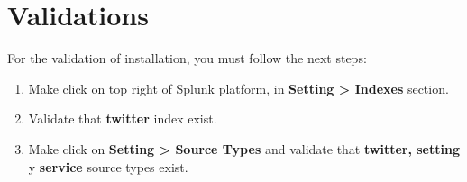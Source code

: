 \documentclass[report]{article}
\begin{document}
\section{Validations}

For the validation of installation, you must follow the next steps:
\newline

\begin{enumerate}[label=(\alph*)]
\item Make click on top right of Splunk platform, in \textbf{Setting > Indexes} section.
\item Validate that \textbf{twitter} index exist.
\item Make click on \textbf{Setting > Source Types} and validate that \textbf{twitter, setting} y \textbf{service} source types exist.
\newline
\end{enumerate}
\end{document}
